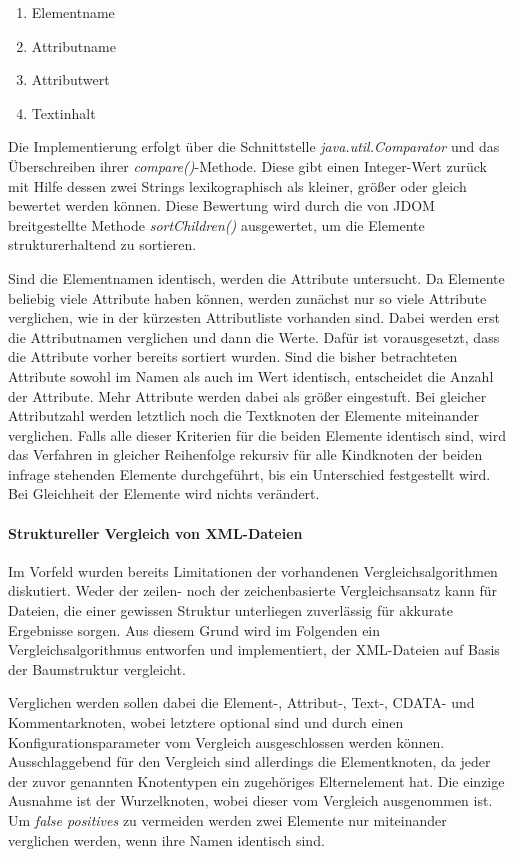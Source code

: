 \newpage
\begin{enumerate}
    \item Elementname
    \item Attributname
    \item Attributwert
    \item Textinhalt
\end{enumerate}

Die Implementierung erfolgt über die Schnittstelle \emph{java.util.Comparator} und das Überschreiben ihrer \textit{compare()}-Methode. Diese gibt einen Integer-Wert zurück mit Hilfe dessen zwei Strings lexikographisch als kleiner, größer oder gleich bewertet werden können. Diese Bewertung wird durch die von JDOM breitgestellte Methode \textit{sortChildren()} ausgewertet, um die Elemente strukturerhaltend zu sortieren.

Sind die Elementnamen identisch, werden die Attribute untersucht. Da Elemente beliebig viele Attribute haben können, werden zunächst nur so viele Attribute verglichen, wie in der kürzesten Attributliste vorhanden sind. Dabei werden erst die Attributnamen verglichen und dann die Werte. Dafür ist vorausgesetzt, dass die Attribute vorher bereits sortiert wurden. Sind die bisher betrachteten Attribute sowohl im Namen als auch im Wert identisch, entscheidet die Anzahl der Attribute. Mehr Attribute werden dabei als größer eingestuft. Bei gleicher Attributzahl werden letztlich noch die Textknoten der Elemente miteinander verglichen. Falls alle dieser Kriterien für die beiden Elemente identisch sind, wird das Verfahren in gleicher Reihenfolge rekursiv für alle Kindknoten der beiden infrage stehenden Elemente durchgeführt, bis ein Unterschied festgestellt wird. Bei Gleichheit der Elemente wird nichts verändert.

\paragraph{Struktureller Vergleich von XML-Dateien}\mbox{}

Im Vorfeld wurden bereits Limitationen der vorhandenen Vergleichsalgorithmen diskutiert. Weder der zeilen- noch der zeichenbasierte Vergleichsansatz kann für Dateien, die einer gewissen Struktur unterliegen zuverlässig für akkurate Ergebnisse sorgen. Aus diesem Grund wird im Folgenden ein Vergleichsalgorithmus entworfen und implementiert, der XML-Dateien auf Basis der Baumstruktur vergleicht.

Verglichen werden sollen dabei die Element-, Attribut-, Text-, CDATA- und Kommentarknoten, wobei letztere optional sind und durch einen Konfigurationsparameter vom Vergleich ausgeschlossen werden können. Ausschlaggebend für den Vergleich sind allerdings die Elementknoten, da jeder der zuvor genannten Knotentypen ein zugehöriges Elternelement hat. Die einzige Ausnahme ist der Wurzelknoten, wobei dieser vom Vergleich ausgenommen ist. Um \emph{false positives} zu vermeiden werden zwei Elemente nur miteinander verglichen werden, wenn ihre Namen identisch sind.

